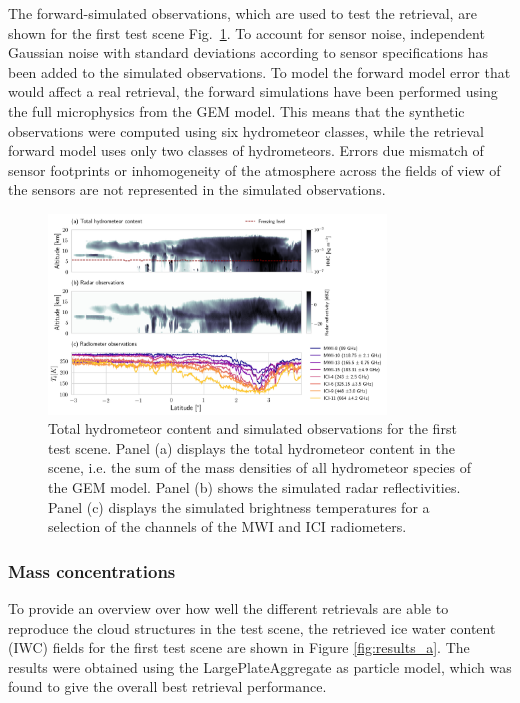 \documentclass[journal abbreviation, manuscript]{copernicus}
\begin{document}
The forward-simulated observations, which are used to test the retrieval, are shown
for the first test scene Fig.~\ref{fig:observations_a}. To account for sensor
noise, independent Gaussian noise with standard deviations according to sensor
specifications has been added to the simulated observations. To model the
forward model error that would affect a real retrieval, the forward simulations
have been performed using the full microphysics from the GEM model. This means
that the synthetic observations were computed using six hydrometeor classes,
while the retrieval forward model uses only two classes of hydrometeors. Errors
due mismatch of sensor footprints or inhomogeneity of the atmosphere across the
fields of view of the sensors are not represented in the simulated observations.


\begin{figure}
\centering
\includegraphics[width = 0.8\textwidth]{../plots/observations_a}
\caption{Total hydrometeor content and simulated observations for the first test
  scene. Panel (a) displays the total hydrometeor content in the scene, i.e. the
  sum of the mass densities of all hydrometeor species of the GEM model. Panel
  (b) shows the simulated radar reflectivities. Panel (c) displays the simulated
  brightness temperatures for a selection of the channels of the MWI and ICI
  radiometers.}
\label{fig:observations_a}
\end{figure}

\subsubsection{Mass concentrations}

To provide an overview over how well the different retrievals are able to
reproduce the cloud structures in the test scene, the retrieved ice water
content (IWC) fields for the first test scene are shown in Figure
\ref{fig:results_a}. The results were obtained using the LargePlateAggregate as
particle model, which was found to give the overall best retrieval performance.
\end{document}
